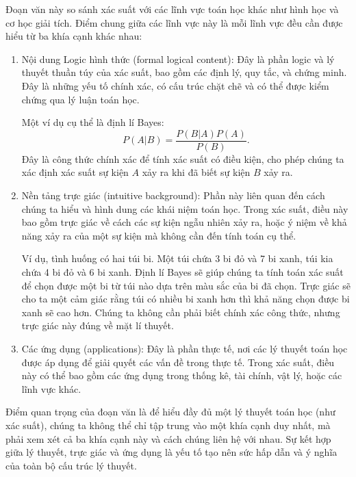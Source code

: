 Đoạn văn này so sánh xác suất với các lĩnh vực toán học khác như hình học và cơ học giải tích. Điểm chung giữa các lĩnh vực này là mỗi lĩnh vực đều cần được hiểu từ ba khía cạnh khác nhau:
\begin{enumerate}
    \item Nội dung Logic hình thức (formal logical content): Đây là phần logic và lý thuyết thuần túy của xác suất, bao gồm các định lý, quy tắc, và chứng minh. Đây là những yếu tố chính xác, có cấu trúc chặt chẽ và có thể được kiểm chứng qua lý luận toán học. 
    
    Một ví dụ cụ thể là định lí Bayes:
    \begin{equation*}
        P(A\vert B)=\frac{P(B\vert A)P(A)}{P(B)}.
    \end{equation*}
    Đây là công thức chính xác để tính xác suất có điều kiện, cho phép chúng ta xác định xác suất sự kiện $A$ xảy ra khi đã biết sự kiện $B$ xảy ra.
    \item Nền tảng trực giác (intuitive background): Phần này liên quan đến cách chúng ta hiểu và hình dung các khái niệm toán học. Trong xác suất, điều này bao gồm trực giác về cách các sự kiện ngẫu nhiên xảy ra, hoặc ý niệm về khả năng xảy ra của một sự kiện mà không cần đến tính toán cụ thể. 
    
    Ví dụ, tình huống có hai túi bi. Một túi chứa 3 bi đỏ và 7 bi xanh, túi kia chứa 4 bi đỏ và 6 bi xanh. Định lí Bayes sẽ giúp chúng ta tính toán xác suất để chọn được một bi từ túi nào dựa trên màu sắc của bi đã chọn. Trực giác sẽ cho ta một cảm giác rằng túi có nhiều bi xanh hơn thì khả năng chọn được bi xanh sẽ cao hơn. Chúng ta không cần phải biết chính xác công thức, nhưng trực giác này đúng về mặt lí thuyết.

    \item Các ứng dụng (applications): Đây là phần thực tế, nơi các lý thuyết toán học được áp dụng để giải quyết các vấn đề trong thực tế. Trong xác suất, điều này có thể bao gồm các ứng dụng trong thống kê, tài chính, vật lý, hoặc các lĩnh vực khác.
\end{enumerate}
Điểm quan trọng của đoạn văn là để hiểu đầy đủ một lý thuyết toán học (như xác suất), chúng ta không thể chỉ tập trung vào một khía cạnh duy nhất, mà phải xem xét cả ba khía cạnh này và cách chúng liên hệ với nhau. Sự kết hợp giữa lý thuyết, trực giác và ứng dụng là yếu tố tạo nên sức hấp dẫn và ý nghĩa của toàn bộ cấu trúc lý thuyết.

